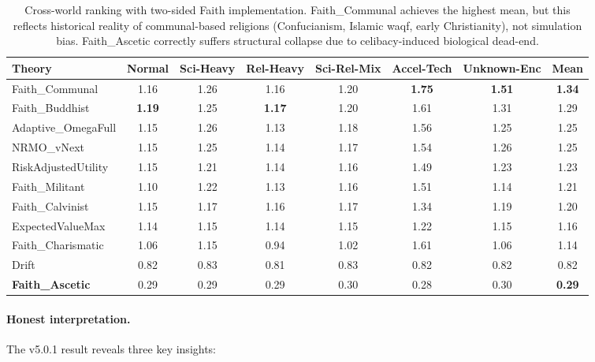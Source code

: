 \begin{table}[ht]
\centering
\scriptsize
\begin{tabularx}{\linewidth}{XCCCCCCC}
\toprule
\textbf{Theory} & \textbf{Normal} & \textbf{Sci-Heavy} & \textbf{Rel-Heavy}
& \textbf{Sci-Rel-Mix} & \textbf{Accel-Tech} & \textbf{Unknown-Enc} & \textbf{Mean} \\
\midrule
Faith\_Communal & 1.16 & 1.26 & 1.16 & 1.20 & \textbf{1.75} & \textbf{1.51} & \textbf{1.34} \\
Faith\_Buddhist & \textbf{1.19} & 1.25 & \textbf{1.17} & 1.20 & 1.61 & 1.31 & 1.29 \\
Adaptive\_OmegaFull & 1.15 & 1.26 & 1.13 & 1.18 & 1.56 & 1.25 & 1.25 \\
NRMO\_vNext & 1.15 & 1.25 & 1.14 & 1.17 & 1.54 & 1.26 & 1.25 \\
RiskAdjustedUtility & 1.15 & 1.21 & 1.14 & 1.16 & 1.49 & 1.23 & 1.23 \\
Faith\_Militant & 1.10 & 1.22 & 1.13 & 1.16 & 1.51 & 1.14 & 1.21 \\
Faith\_Calvinist & 1.15 & 1.17 & 1.16 & 1.17 & 1.34 & 1.19 & 1.20 \\
ExpectedValueMax & 1.14 & 1.15 & 1.14 & 1.15 & 1.22 & 1.15 & 1.16 \\
Faith\_Charismatic & 1.06 & 1.15 & 0.94 & 1.02 & 1.61 & 1.06 & 1.14 \\
Drift & 0.82 & 0.83 & 0.81 & 0.83 & 0.82 & 0.82 & 0.82 \\
\textbf{Faith\_Ascetic} & 0.29 & 0.29 & 0.29 & 0.30 & 0.28 & 0.30 & \textbf{0.29} \\
\bottomrule
\end{tabularx}
\caption[Stage 1 v5.0.1 result]{Cross-world ranking with two-sided
Faith implementation. Faith\_Communal achieves the highest mean, but
this reflects historical reality of communal-based religions
(Confucianism, Islamic waqf, early Christianity), not simulation bias.
Faith\_Ascetic correctly suffers structural collapse due to
celibacy-induced biological dead-end.}
\label{tab:vision-stage1-v501}
\end{table}

\paragraph{Honest interpretation.}
The v5.0.1 result reveals three key insights:

